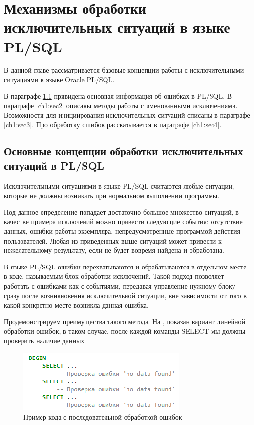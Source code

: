 \chapter{Механизмы обработки исключительных ситуаций в языке PL/SQL} \label{ch1}

В данной главе рассматривается базовые концепции работы с исключительными ситуациями в языке Oracle PL/SQL.

В параграфе \ref{ch1:sec1} привидена основная информация об ошибках в PL/SQL. В параграфе \ref{ch1:sec2} описаны методы работы с именованными исключениями. Возможности для инициирования исключительных ситуаций описаны в параграфе \ref{ch1:sec3}. Про обработку ошибок рассказывается в параграфе \ref{ch1:sec4}.


\section{Основные концепции обработки исключительных ситуаций в PL/SQL} \label{ch1:sec1}

Исключительными ситуациями в языке PL/SQL считаются любые ситуации, которые не должны возникать при нормальном выполнении программы\cite{ferstein}. 

Под данное определение попадает достаточно большое множество ситуаций, в качестве примера исключений можно привести следующие события: отсутствие данных, ошибки работы экземпляра, непредусмотренные программой действия пользователей. Любая из приведенных выше ситуаций может привести к нежелательному результату, если не будет вовремя найдена и обработана.
 
В языке PL/SQL ошибки перехватываются и обрабатываются в отдельном месте в коде, называемым блок обработки исключений. Такой подход позволяет работать с ошибками как с событиями, передавая управление нужному блоку сразу после возникновения исключительной ситуации, вне зависимости от того в какой конкретно месте возникла данная ошибка. 

Продемонстрируем преимущества такого метода. 
На , показан вариант линейной обработки ошибок, в таком случае, после каждой команды SELECT мы должны проверить наличие данных.

\begin{figure}[ht!] 
	\center
	\includegraphics [scale=1] {my_folder/img/C1_code1.png}
	\caption{Пример кода с последовательной обработкой ошибок} 
	\label{fig:c1_code1}  
\end{figure}
\FloatBarrier


